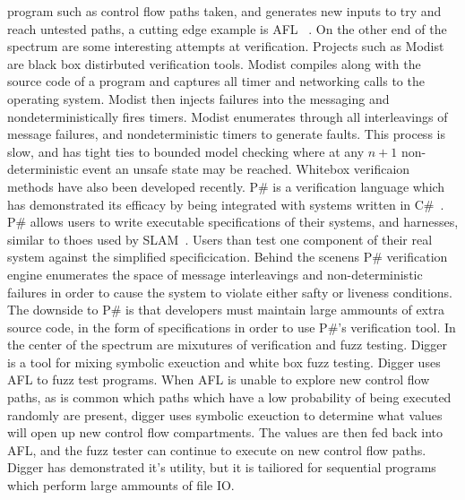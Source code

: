 program such as control flow paths taken, and generates new inputs to try and
reach untested paths, a cutting edge example is AFL ~\cite{}. On the other end
of the spectrum are some interesting attempts at verification. Projects such as
Modist ~\cite{} are black box distirbuted verification tools. Modist compiles
along with the source code of a program and captures all timer and networking
calls to the operating system. Modist then injects failures into the messaging
and nondeterministically fires timers. Modist enumerates through all
interleavings of message failures, and nondeterministic timers to generate
faults. This process is slow, and has tight ties to bounded model checking
where at any $n+1$ non-deterministic event an unsafe state may be reached.
Whitebox verificaion methods have also been developed recently. P\# is a
verification language which has demonstrated its efficacy by being integrated
with systems written in C\#~\cite{}. P\# allows users to write executable
specifications of their systems, and harnesses, similar to thoes used by
SLAM~\cite{}. Users than test one component of their real system against the
simplified specificication. Behind the scenens P\# verification engine
enumerates the space of message interleavings and non-deterministic failures in
order to cause the system to violate either safty or liveness conditions. The
downside to P\# is that developers must maintain large ammounts of extra source
code, in the form of specifications in order to use P\#'s verification tool. In
the center of the spectrum are mixutures of verification and fuzz testing.
Digger is a tool for mixing symbolic exeuction and white box fuzz testing.
Digger uses AFL to fuzz test programs. When AFL is unable to explore new
control flow paths, as is common which paths which have a low probability of
being executed randomly are present, digger uses symbolic exeuction to
determine what values will open up new control flow compartments. The values
are then fed back into AFL, and the fuzz tester can continue to execute on new
control flow paths. Digger has demonstrated it's utility, but it is tailiored
for sequential programs which perform large ammounts of file IO.

